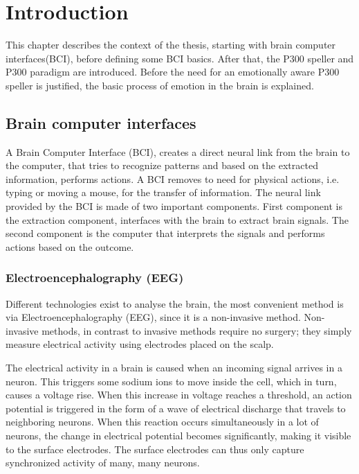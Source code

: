 \chapter{Introduction}
{\samenvatting This chapter describes the context of the thesis, starting with brain computer interfaces(BCI), before defining some BCI basics. After that, the P300 speller and P300 paradigm are introduced. Before the need for an emotionally aware P300 speller is justified, the basic process of emotion in the brain is explained.}


\section{Brain computer interfaces}

A Brain Computer Interface (BCI), creates a direct neural link from the brain to the computer\cite{LangModel}, that tries to recognize patterns and based on the extracted information, performs actions. A BCI removes to need for physical actions, i.e. typing or moving a mouse, for the transfer of information. The neural link provided by the BCI is made of two important components. First component is the extraction component, interfaces with the brain to extract brain signals. The second component is the computer that interprets the signals and performs actions based on the outcome.


\subsection{Electroencephalography (EEG)}
Different technologies exist to analyse the brain, the most convenient method is via Electroencephalography (EEG), since it is a non-invasive method. Non-invasive methods, in contrast to invasive methods require no surgery; they simply measure electrical activity using electrodes placed on the scalp.

\npar

The electrical activity in a brain is caused when an incoming signal arrives in a neuron. This triggers some sodium ions to move inside the cell, which in turn, causes a voltage rise\cite{ExtendedPaper}. When this increase in voltage reaches a threshold, an action potential is triggered in the form of a wave of electrical discharge that travels to neighboring neurons. When this reaction occurs simultaneously in a lot of neurons, the change in electrical potential becomes significantly, making it visible to the surface electrodes. The surface electrodes can thus only capture synchronized activity of many, many neurons.

